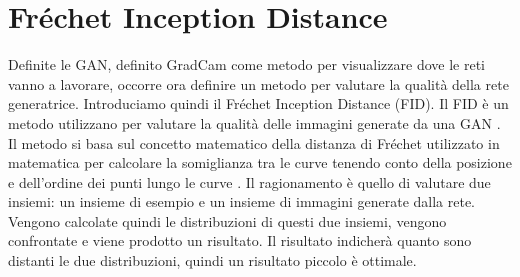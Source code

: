 \section{Fréchet Inception Distance}
Definite le GAN, definito GradCam come metodo per visualizzare dove le reti vanno a lavorare, occorre ora definire un metodo per valutare la qualità della rete generatrice. Introduciamo quindi il Fréchet Inception Distance (FID). Il FID è un metodo utilizzano per valutare la qualità delle immagini generate da una GAN \cite{DBLP:journals/corr/HeuselRUNKH17}. Il metodo si basa sul concetto matematico della distanza di Fréchet utilizzato in matematica per calcolare la somiglianza tra le curve tenendo conto della posizione e dell'ordine dei punti lungo le curve \cite{eiter1994computing}. Il ragionamento è quello di valutare due insiemi: un insieme di esempio e un insieme di immagini generate dalla rete. Vengono calcolate quindi le distribuzioni di questi due insiemi, vengono confrontate e viene prodotto un risultato. Il risultato indicherà quanto sono distanti le due distribuzioni, quindi un risultato piccolo è ottimale. 